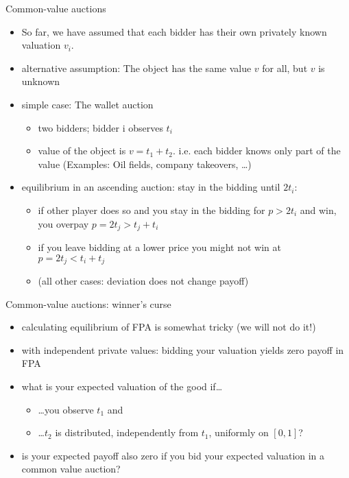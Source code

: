 \documentclass[bigger]{beamer}
\begin{document}
\begin{frame}[label={sec:org0b6e315}]{Common-value auctions}
\begin{itemize}
\item So far, we have assumed that each bidder has their own privately known valuation \(v_ i\).
\item alternative assumption: The object has the same value \(v\) for all, but \(v\) is unknown
\item simple case: The wallet auction
\begin{itemize}
\item two bidders; bidder i observes \(t_i\)
\item value of the object is \(v = t_1 + t_2\). i.e. each bidder knows only part of the value (Examples: Oil ﬁelds, company takeovers, \ldots{})
\end{itemize}
\item equilibrium in an ascending auction: \linebreak stay in the bidding until \(2t_i\):
\begin{itemize}
\item if other player does so and you stay in the bidding for \(p > 2t_i\) and win, you overpay \(p = 2t_j > t_j + t_i\)
\item if you leave bidding at a lower price you might not win at \(p= 2t_j < t_ i+t_j\)
\item (all other cases: deviation does not change payoff)
\end{itemize}
\end{itemize}
\end{frame}

\begin{frame}[label={sec:orge77d62d}]{Common-value auctions: winner's curse}
\begin{itemize}
\item calculating equilibrium of FPA is somewhat tricky (we will not do it!)
\item with independent private values: bidding your valuation yields zero payoff in FPA
\item what is your expected valuation of the good if\ldots{}
\begin{itemize}
\item \ldots{}you observe \(t_1\) and
\item \ldots{}\(t_2\) is distributed, independently from \(t_1\), uniformly on \([0,1]\)?
\pause
\end{itemize}
\item is your expected payoff also zero if you bid your expected valuation in a common value auction?
\end{itemize}
\end{frame}
\end{document}
